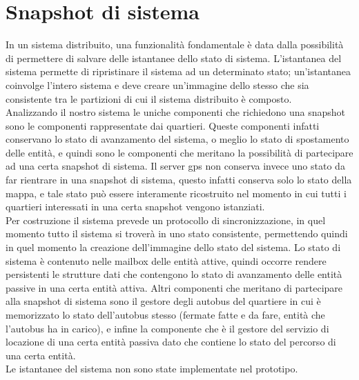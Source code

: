 \section{Snapshot di sistema}
In un sistema distribuito, una funzionalità fondamentale è data dalla
possibilità di permettere di salvare delle istantanee dello stato di sistema.
L'istantanea del sistema permette di ripristinare il sistema ad un determinato
stato; un'istantanea coinvolge l'intero sistema e deve creare un'immagine
dello stesso che sia consistente tra le partizioni di cui il sistema
distribuito è composto. \\
Analizzando il nostro sistema le uniche componenti che richiedono una snapshot
sono le componenti rappresentate dai quartieri. Queste componenti infatti
conservano lo stato di avanzamento del sistema, o meglio lo stato di
spostamento delle entità, e quindi sono le componenti che meritano la
possibilità di partecipare ad una certa snapshot di sistema. Il server gps non
conserva invece uno stato da far rientrare in una snapshot di sistema, questo
infatti conserva solo lo stato della mappa, e tale stato può essere interamente
ricostruito nel momento in cui tutti i quartieri interessati in una certa
snapshot vengono istanziati. \\
Per costruzione il sistema prevede un protocollo di sincronizzazione, in quel
momento tutto il sistema si troverà in uno stato consistente, permettendo
quindi in quel momento la creazione dell'immagine dello stato del sistema. Lo
stato di sistema è contenuto nelle mailbox delle entità attive, quindi occorre
rendere persistenti le strutture dati che contengono lo stato di avanzamento
delle entità passive in una certa entità attiva. Altri componenti che meritano
di partecipare alla snapshot di sistema sono il gestore degli autobus del
quartiere in cui è memorizzato lo stato dell'autobus stesso (fermate fatte e da
fare, entità che l'autobus ha in carico), e infine la componente che è il
gestore del servizio di locazione di una certa entità passiva dato che contiene
lo stato del percorso di una certa entità.\\
Le istantanee del sistema non sono state implementate nel prototipo.